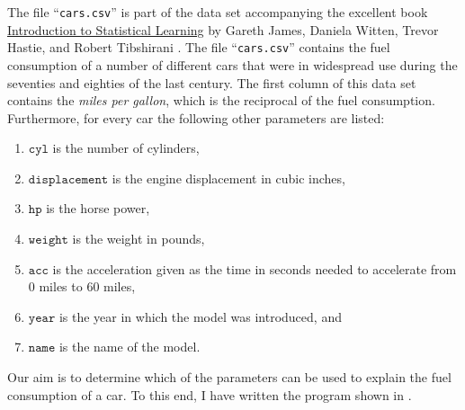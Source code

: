 The file ``\texttt{cars.csv}'' is part of the data set accompanying the excellent book 
\href{http://www-bcf.usc.edu/~gareth/ISL/index.html}{Introduction to Statistical Learning} by Gareth James,
Daniela Witten, Trevor Hastie, and Robert Tibshirani \cite{james:2014}.  The file 
``\texttt{cars.csv}''  contains the fuel consumption of a number of different cars that were in widespread use during
the seventies and eighties of the last century.  The first column of this data set contains the 
\emph{\color{blue}miles per gallon}, which is the reciprocal of the fuel consumption. Furthermore, for every
car the following other parameters are listed:
\begin{enumerate}
\item $\mathtt{cyl}$ is the number of cylinders,
\item $\mathtt{displacement}$ is the engine displacement in cubic inches, 
\item $\mathtt{hp}$ is the horse power,
\item $\mathtt{weight}$ is the weight in pounds,
\item $\mathtt{acc}$ is the acceleration given as the time in seconds needed to accelerate from 0 miles to 60 miles,
\item $\mathtt{year}$ is the year in which the model was introduced, and
\item $\mathtt{name}$ is the name of the model.
\end{enumerate}
Our aim is to determine which of the parameters can be used to explain the fuel consumption of a car.  To this
end, I have written the program shown in .


